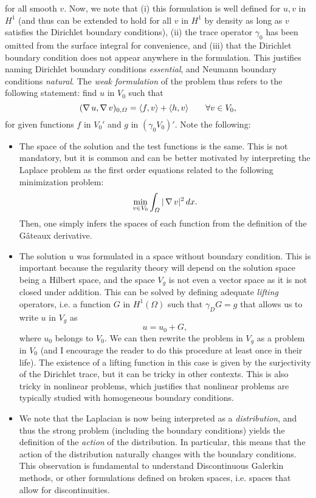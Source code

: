 for all smooth $v$. Now, we note that (i) this formulation is well defined for $u,v$ in $H^1$ (and thus can be extended to hold for all $v$ in $H^1$ by density as long as $v$ satisfies the Dirichlet boundary conditions), (ii) the trace operator $\gamma_0$ has been omitted from the surface integral for convenience, and (iii) that the Dirichlet boundary condition does not appear anywhere in the formulation. This justifies naming Dirichlet boundary conditions \emph{essential}, and Neumann boundary conditions \emph{natural}. The \emph{weak formulation} of the problem thus refers to the following statement: find $u$ in $V_0$ such that
\begin{equation}\label{eq:weak-form-poisson}
    (\operatorname{\nabla} u, \operatorname{\nabla} v)_{0,\Omega} = \langle f, v\rangle  + \langle h,  v\rangle \qquad \forall v\in V_0,
\end{equation}
for given functions $f$ in $V_0'$ and $g$ in $(\gamma_0 V_0)'$. Note the following: 
\begin{itemize}
    \item The space of the solution and the test functions is the same. This is not mandatory, but it is common and can be better motivated by interpreting the Laplace problem as the first order equations related to the following minimization problem: 
    \begin{equation*}
        \min_{v \in V_0} \int_\Omega |\operatorname{\nabla} v|^2\,dx .
    \end{equation*}
    Then, one simply infers the spaces of each function from the definition of the Gâteaux derivative. 
    \item The solution $u$ was formulated in a space without boundary condition. This is important because the regularity theory will depend on the solution space being a Hilbert space, and the space $V_g$ is not even a vector space as it is not closed under addition. This can be solved by defining adequate \emph{lifting} operators, i.e. a function $G$ in $H^1(\Omega)$ such that $\gamma_D G = g$ that allows us to write $u$ in $V_g$ as 
    \begin{equation*}
        u = u_0 + G,
    \end{equation*}
    where $u_0$ belongs to $V_0$. We can then rewrite the problem in $V_g$ as a problem in $V_0$ (and I encourage the reader to do this procedure at least once in their life). The existence of a lifting function in this case is given by the surjectivity of the Dirichlet trace, but it can be tricky in other contexts. This is also tricky in nonlinear problems, which justifies that nonlinear problems are typically studied with homogeneous boundary conditions.  
    \item We note that the Laplacian is now being interpreted as a \emph{distribution}, and thus the strong problem (including the boundary conditions) yields the definition of the \emph{action} of the distribution. In particular, this means that the action of the distribution naturally changes with the boundary conditions. This observation is fundamental to understand Discontinuous Galerkin methods, or other formulations defined on broken spaces, i.e. spaces that allow for discontinuities. 
\end{itemize}

